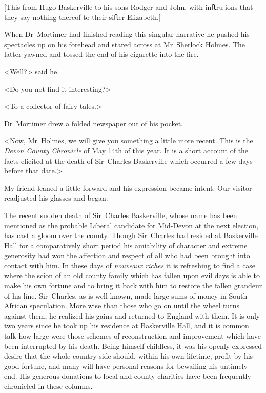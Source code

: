 [This from Hugo Baskerville to his sons Rodger and John, with inﬅruions that they say nothing thereof to their siﬅer Elizabeth.]
\normalfont

\divider

When Dr~Mortimer had finished reading this singular narrative he pushed his spectacles up on his forehead and stared across at Mr~Sherlock Holmes. The latter yawned and tossed the end of his cigarette into the fire.

<Well?> said he.

<Do you not find it interesting?>

<To a collector of fairy tales.>

Dr~Mortimer drew a folded newspaper out of his pocket.

<Now, Mr~Holmes, we will give you something a little more recent. This is the \textit{Devon County Chronicle} of May 14th of this year. It is a short account of the facts elicited at the death of Sir~Charles Baskerville which occurred a few days before that date.>

My friend leaned a little forward and his expression became intent. Our visitor readjusted his glasses and began:— 

\divider

\textsf{The recent sudden death of Sir~Charles Baskerville, whose name has been mentioned as the probable Liberal candidate for Mid-Devon at the next election, has cast a gloom over the county. Though Sir~Charles had resided at Baskerville Hall for a comparatively short period his amiability of character and extreme generosity had won the affection and respect of all who had been brought into contact with him. In these days of \emph{nouveaux riches} it is refreshing to find a case where the scion of an old county family which has fallen upon evil days is able to make his own fortune and to bring it back with him to restore the fallen grandeur of his line. Sir~Charles, as is well known, made large sums of money in South African speculation. More wise than those who go on until the wheel turns against them, he realized his gains and returned to England with them. It is only two years since he took up his residence at Baskerville Hall, and it is common talk how large were those schemes of reconstruction and improvement which have been interrupted by his death. Being himself childless, it was his openly expressed desire that the whole country-side should, within his own lifetime, profit by his good fortune, and many will have personal reasons for bewailing his untimely end. His generous donations to local and county charities have been frequently chronicled in these columns.}


